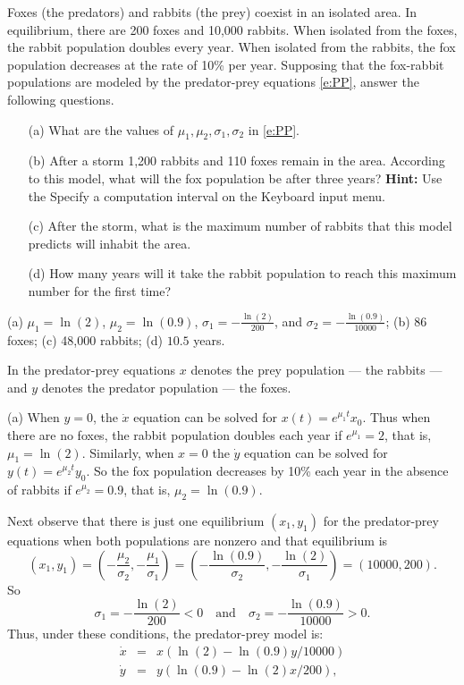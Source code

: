 \documentclass{ximera}
\begin{document}
\begin{computerExercise} \label{c9.1.8}
Foxes (the predators) and rabbits (the prey) coexist in an isolated area.
In equilibrium, there are 200 foxes and 10,000 rabbits.  When isolated from
the foxes, the rabbit population doubles every year.  When isolated from 
the rabbits, the fox population decreases at the rate of 10\% per year. 
Supposing that the fox-rabbit populations are modeled by the predator-prey
equations \eqref{e:PP}, answer the following questions.
\begin{itemize}
\item[(a)]  	What are the values of $\mu_1,\mu_2,\sigma_1,\sigma_2$ in 
\eqref{e:PP}.
\item[(b)]	After a storm 1,200 rabbits and 110 foxes remain in the area.
According to this model, what will the fox population be after three years?  
{\bf Hint:}  Use the {\sf Specify a computation interval} on the 
{\sf \PPLANE Keyboard input} menu.
\item[(c)]	After the storm, what is the maximum number of rabbits that 
this model predicts will inhabit the area.
\item[(d)]	How many years will it take the rabbit population to reach 
this maximum number for the first time?
\end{itemize}

\begin{solution}

\ans (a) $\mu_1=\ln(2)$, $\mu_2=\ln(0.9)$, $\sigma_1 = -\frac{\ln(2)}{200}$,
and $\sigma_2 = -\frac{\ln(0.9)}{10000}$; (b) $86$ foxes; (c) 48,000 rabbits; 
(d) $10.5$ years.

\soln In the predator-prey equations $x$ denotes the prey population --- 
the rabbits --- and $y$ denotes the predator population --- the foxes.

\noindent (a) When $y=0$, the $\dot{x}$ equation can be solved for 
$x(t)=e^{\mu_1t}x_0$.  Thus when there are no foxes, the rabbit population 
doubles each year if $e^{\mu_1}=2$, that is, $\mu_1=\ln(2)$.  Similarly, when
$x=0$ the $\dot{y}$ equation can be solved for $y(t)=e^{\mu_2 t}y_0$.  So the
fox population decreases by 10\% each year in the absence of rabbits if 
$e^{\mu_2}=0.9$, that is, $\mu_2=\ln(0.9)$.

Next observe that there is just one equilibrium $(x_1,y_1)$ for the 
predator-prey equations when both populations are nonzero and that 
equilibrium is 
\[
(x_1,y_1) = \left(-\frac{\mu_2}{\sigma_2},-\frac{\mu_1}{\sigma_1}\right) = 
\left(-\frac{\ln(0.9)}{\sigma_2},-\frac{\ln(2)}{\sigma_1}\right) = 
(10000,200).
\]
So
\[
\sigma_1 = -\frac{\ln(2)}{200}<0 \quad \mbox{and} \quad
\sigma_2 = -\frac{\ln(0.9)}{10000}>0.
\]
Thus, under these conditions, the predator-prey model is:
\begin{equation}  \label{E:PPspec}
\begin{array}{rcl}
\dot{x} & = & x(\ln(2) - \ln(0.9)y/10000) \\
\dot{y} & = & y(\ln(0.9) - \ln(2)x/200),
\end{array}
\end{equation}


\end{solution}
\end{computerExercise}
\end{document}
